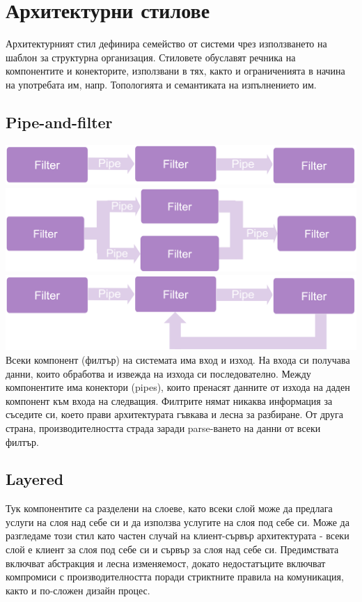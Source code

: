 \documentclass[fleqn,12pt]{article}
\begin{document}
\section{Архитектурни стилове}

Архитектурният стил дефинира семейство от системи чрез използването на
шаблон за структурна организация.
Стиловете обуславят речника на компонентите и конекторите, използвани в тях, както и ограниченията в начина на употребата им, напр. Топологията и семантиката на изпълнението им.

\subsection{Pipe-and-filter}
\includegraphics[width=175mm]{paf_simple.png}
\includegraphics[width=175mm]{paf_branched.png}
\includegraphics[width=175mm]{paf_loop.png}
Всеки компонент (филтър) на системата има вход и изход. На входа си получава данни, които обработва и извежда на изхода си последователно. Между компонентите има конектори (pipes), които пренасят данните от изхода на даден компонент към входа на следващия. Филтрите нямат никаква информация за съседите си, което прави архитектурата гъвкава и лесна за разбиране. От друга страна, производителността страда заради parse-ването на данни от всеки филтър.

\subsection{Layered}
Тук компонентите са разделени на слоеве, като всеки слой може да предлага услуги на слоя над себе си и да използва услугите на слоя под себе си. Може да разгледаме този стил като частен случай на клиент-сървър архитектурата - всеки слой е клиент за слоя под себе си и сървър за слоя над себе си. Предимствата включват абстракция и лесна изменяемост, докато недостатъците включват компромиси с производителността поради стриктните правила на комуникация, както и по-сложен дизайн процес.
\end{document}
